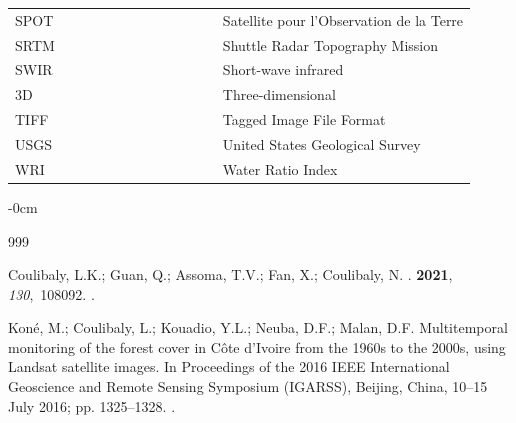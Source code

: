 \documentclass[jimaging,article,accept,pdftex,moreauthors]{Definitions/mdpi}
\begin{document}
{\begin{tabular}{@{}ll}
SPOT & ~~~~~~~~~~~~~~~~~~~~~~Satellite pour l'Observation de la Terre \\
SRTM & ~~~~~~~~~~~~~~~~~~~~~~Shuttle Radar Topography Mission \\
SWIR & ~~~~~~~~~~~~~~~~~~~~~~Short-wave infrared \\
3D & ~~~~~~~~~~~~~~~~~~~~~~Three-dimensional \\
TIFF & ~~~~~~~~~~~~~~~~~~~~~~Tagged Image File Format \\
USGS & ~~~~~~~~~~~~~~~~~~~~~~United States Geological Survey \\
WRI & ~~~~~~~~~~~~~~~~~~~~~~Water Ratio Index \\
\end{tabular}
}

\begin{adjustwidth}{-\extralength}{0cm}


\begin{thebibliography}{999}

Coulibaly, L.K.; Guan, Q.; Assoma, T.V.; Fan, X.; Coulibaly, N.
.
 {\bf 2021}, {\em 130},~108092.
.

Koné, M.; Coulibaly, L.; Kouadio, Y.L.; Neuba, D.F.; Malan, D.F.
\newblock Multitemporal monitoring of the forest cover in Côte d'Ivoire from
  the 1960s to the 2000s, using Landsat satellite images.
\newblock In Proceedings of the 2016 IEEE International Geoscience and Remote
  Sensing Symposium (IGARSS), Beijing, China, 10--15 July 2016; pp. 1325--1328.
. %


\end{thebibliography}
\end{adjustwidth}
\end{document}
